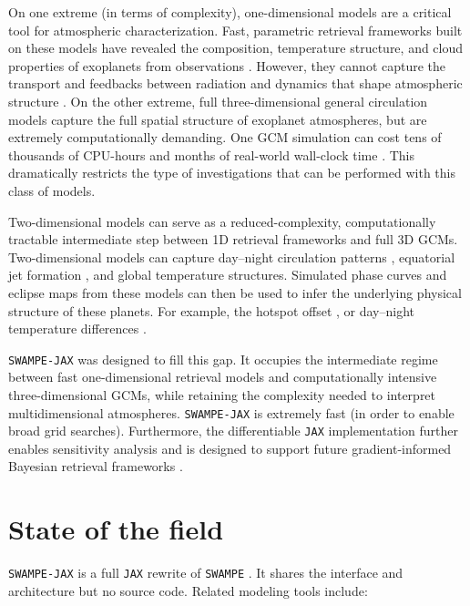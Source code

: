 \documentclass[10pt,a4paper,onecolumn]{article}
\begin{document}
On one extreme (in terms of complexity), one-dimensional models are a critical tool for atmospheric characterization. Fast, parametric retrieval frameworks built on these models have revealed the composition, temperature structure, and cloud properties of exoplanets from observations \citep[e.g.,][]{Madhusudhan:2009, Rustamkulov:2023}. However, they cannot capture the transport and feedbacks between radiation and dynamics that shape atmospheric structure \citep{Madhusudhan:2019}. On the other extreme, full three-dimensional general circulation models \citep[e.g.,][]{Carone:2020, Kataria:2016, Showman:2009} capture the full spatial structure of exoplanet atmospheres, but are extremely computationally demanding. One GCM simulation can cost tens of thousands of CPU-hours and months of real-world wall-clock time \citep{Wang:2020}. This dramatically restricts the type of investigations that can be performed with this class of models.

Two-dimensional models can serve as a reduced-complexity, computationally tractable intermediate step between 1D retrieval frameworks and full 3D GCMs. Two-dimensional models can capture day--night circulation patterns \citep[e.g.,][]{Perez-Becker:2013, Showman:2011}, equatorial jet formation \citep{Showman:2011}, and global temperature structures. Simulated phase curves and eclipse maps from these models can then be used to infer the underlying physical structure of these planets. For example, the hotspot offset \citep{Penn:2017}, or day--night temperature differences \citep{Perez-Becker:2013}.

\texttt{SWAMPE-JAX} was designed to fill this gap. It occupies the intermediate regime between fast one-dimensional retrieval models and computationally intensive three-dimensional GCMs, while retaining the complexity needed to interpret multidimensional atmospheres. \texttt{SWAMPE-JAX} is extremely fast (in order to enable broad grid searches). Furthermore, the differentiable \texttt{JAX} implementation further enables sensitivity analysis and is designed to support future gradient-informed Bayesian retrieval frameworks \citep[e.g.,][]{Kawahara:2025}.

\section{State of the field}

\texttt{SWAMPE-JAX} is a full \texttt{JAX} rewrite of \texttt{SWAMPE} \citep{Landgren:2022}. It shares the interface and architecture but no source code. Related modeling tools include:
\end{document}
